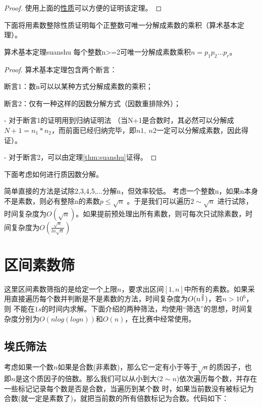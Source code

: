 \begin{proof}
	使用上面的\hyperref[pro:prime]{性质}可以方便的证明该定理。
\end{proof}

\vbox{}

下面将用{\heiti 素数整除性质}证明每个正整数可唯一分解成素数的乘积（算术基本定理）。

\begin{theorem}{算术基本定理}{suanshu}
	每个整数n>=2可唯一分解成素数乘积$n=p_1p_2...p_r$。
\end{theorem}

\begin{proof}
算术基本定理包含两个断言：

断言1：数n可以以某种方式分解成素数的乘积；

断言2：仅有一种这样的因数分解方式（因数重排除外）；

- 对于断言1的证明用到归纳证明法 （当N+1是合数时，其必然可以分解成$N+1=n_1*n_2$，而前面已经归纳完毕，即$n1,\ n2$一定可以分解成素数，因此得证）。

- 对于断言2，可以由定理\ref{thm:suanshu}证得。
\end{proof}

\vbox{}

下面考虑如何进行质因数分解。

简单直接的方法是试除2,3,4,5,...分解n，但效率较低。
考虑一个整数n，如果n本身不是素数，则必有整除n的素数$p\leqslant \sqrt{n}$ 。于是我们可以遍历$2\sim \sqrt{n}$
进行试除，时间复杂度为$O(\sqrt{n})$。如果提前预处理出所有素数，则可每次只试除素数，时间复杂度为$O(\frac{\sqrt{n}}{ln \sqrt{n}})$



\section{区间素数筛}

这里区间素数筛指的是给定一个上限$n$，要求出区间$[1,n]$中所有的素数。如果采用直接遍历每个数并判断是不是素数的方法，时间复杂度为$O(n^{3\over2})$，若$n>10^6$，则
不能在$1s$的时间内求解。下面介绍的两种筛法，均使用“筛选”的思想，时间复杂度分别为$O(nlog(logn))$和$O(n)$，在比赛中经常使用。

\subsection{埃氏筛法}
考虑如果一个数$n$如果是合数(非素数)，那么它一定有小于等于$\sqrt{n}$的质因子，也即$n$是这个质因子的倍数。那么我们可以从小到大($2\sim n$)依次遍历每个数，并存在一些标记记录每个数是否是合数，当遍历到某个数
时，如果当前数没有被标记为合数(就一定是素数了)，就把当前数的所有倍数标记为合数。代码如下：

